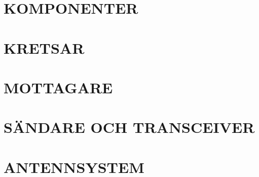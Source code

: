 \documentclass[a4paper,twoside,twocolumn,openright]{book}
\begin{document}
\chapter{KOMPONENTER}

\cleardoublepage

\cleardoublepage

\cleardoublepage

\cleardoublepage

\cleardoublepage

\cleardoublepage

\cleardoublepage

\cleardoublepage


\chapter{KRETSAR}

\cleardoublepage

\cleardoublepage

\cleardoublepage

\cleardoublepage

\cleardoublepage

\cleardoublepage

\cleardoublepage

\cleardoublepage


\chapter{MOTTAGARE}

\cleardoublepage

\cleardoublepage

\cleardoublepage

\cleardoublepage

\cleardoublepage

\cleardoublepage

\cleardoublepage

\cleardoublepage


\chapter{SÄNDARE OCH TRANSCEIVER}

\cleardoublepage

\cleardoublepage


\chapter{ANTENNSYSTEM}

\cleardoublepage

\cleardoublepage

\cleardoublepage

\cleardoublepage

\cleardoublepage


%
%
%
%
%
%
\end{document}
